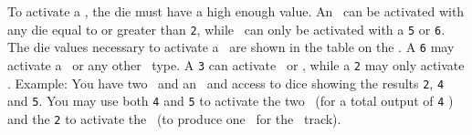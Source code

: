To activate a \fortification, the die must have a high enough value.  An \academy\ can be activated with any die equal to or greater than \texttt{2}, while \starships\ can only be activated with a \texttt{5} or \texttt{6}.  The die values necessary to activate a \fortification\ are shown in the table on the \planetsheet.
\newline\newline
A \texttt{6} may activate a \spacestation\ or any other \fortification\ type. A \texttt{3} can activate \factory\ or \academy, while a \texttt{2} may only activate \academy.
\newline\newline
Example: You have two \labs\ and an \academy\ and access to dice showing the results \texttt{2}, \texttt{4} and \texttt{5}.  You may use both \texttt{4} and \texttt{5} to activate the two \labs\ (for a total output of \texttt{4} \tech) and the \texttt{2} to activate the \academy\ (to produce one \astronaut\ for the \population\ track).
